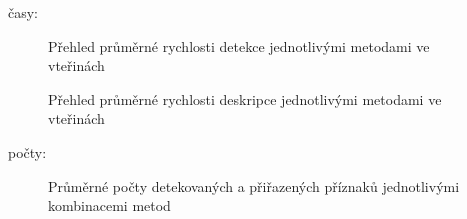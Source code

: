 časy: 

\begin{figure}[htp] 
	\label{det_times}
	\caption{Přehled průměrné rychlosti detekce jednotlivými metodami ve vteřinách}
\end{figure}

\begin{figure}[htp] 
	\label{desc_times}
	\caption{Přehled průměrné rychlosti deskripce jednotlivými metodami ve vteřinách}
\end{figure}

počty:

\begin{figure}[htp] 
	\label{match_count}
	\caption{Průměrné počty detekovaných a přiřazených příznaků jednotlivými kombinacemi metod}
\end{figure}

